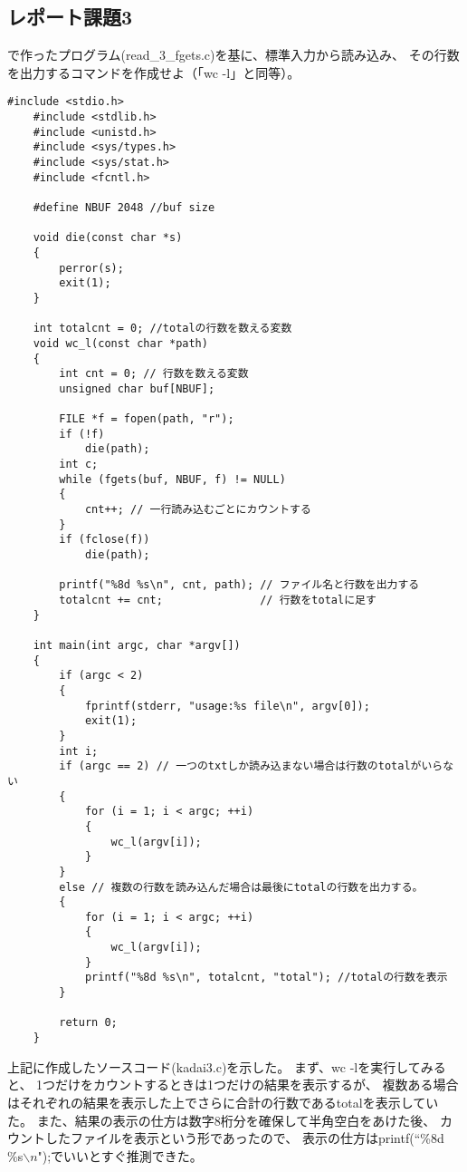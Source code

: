 \documentclass[12pt]{jarticle}
\begin{document}
\subsection{レポート課題3}
\begin{shadebox}
    で作ったプログラム(read\_3\_fgets.c)を基に、標準入力から読み込み、
    その行数を出力するコマンドを作成せよ（「wc -l」と同等）。
\end{shadebox}
\begin{lstlisting}[caption=kadai3.c,label=kadai3, style=lstC]
    #include <stdio.h>
    #include <stdlib.h>
    #include <unistd.h>
    #include <sys/types.h>
    #include <sys/stat.h>
    #include <fcntl.h>
    
    #define NBUF 2048 //buf size
    
    void die(const char *s)
    {
        perror(s);
        exit(1);
    }
    
    int totalcnt = 0; //totalの行数を数える変数
    void wc_l(const char *path)
    {
        int cnt = 0; // 行数を数える変数
        unsigned char buf[NBUF];
    
        FILE *f = fopen(path, "r");
        if (!f)
            die(path);
        int c;
        while (fgets(buf, NBUF, f) != NULL)
        {
            cnt++; // 一行読み込むごとにカウントする
        }
        if (fclose(f))
            die(path);
    
        printf("%8d %s\n", cnt, path); // ファイル名と行数を出力する
        totalcnt += cnt;               // 行数をtotalに足す
    }
    
    int main(int argc, char *argv[])
    {
        if (argc < 2)
        {
            fprintf(stderr, "usage:%s file\n", argv[0]);
            exit(1);
        }
        int i;
        if (argc == 2) // 一つのtxtしか読み込まない場合は行数のtotalがいらない
        {
            for (i = 1; i < argc; ++i)
            {
                wc_l(argv[i]);
            }
        }
        else // 複数の行数を読み込んだ場合は最後にtotalの行数を出力する。
        {
            for (i = 1; i < argc; ++i)
            {
                wc_l(argv[i]);
            }
            printf("%8d %s\n", totalcnt, "total"); //totalの行数を表示
        }
    
        return 0;
    }
\end{lstlisting}

上記に作成したソースコード(kadai3.c)を示した。
まず、wc -lを実行してみると、
1つだけをカウントするときは1つだけの結果を表示するが、
複数ある場合はそれぞれの結果を表示した上でさらに合計の行数であるtotalを表示していた。
また、結果の表示の仕方は数字8桁分を確保して半角空白をあけた後、
カウントしたファイルを表示という形であったので、
表示の仕方はprintf(``\%8d \%s$\backslash n$");でいいとすぐ推測できた。
\end{document}
